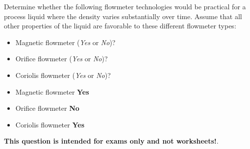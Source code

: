 

Determine whether the following flowmeter technologies would be practical for a process liquid where the density varies substantially over time.  Assume that all other properties of the liquid are favorable to these different flowmeter types:

\begin{itemize}
\item{} Magnetic flowmeter ({\it Yes} or {\it No})?
\vskip 10pt
\item{} Orifice flowmeter ({\it Yes} or {\it No})?
\vskip 10pt
\item{} Coriolis flowmeter ({\it Yes} or {\it No})?
\end{itemize}







\begin{itemize}
\item{} Magnetic flowmeter {\bf Yes}
\item{} Orifice flowmeter {\bf No}
\item{} Coriolis flowmeter {\bf Yes}
\end{itemize}







{\bf This question is intended for exams only and not worksheets!}.



